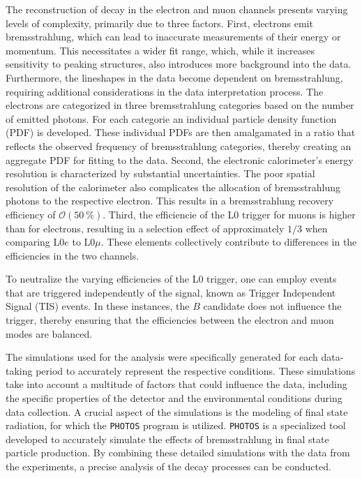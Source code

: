 The reconstruction of decay in the electron and muon channels presents varying levels of 
complexity, primarily due to three factors. First, electrons emit bremsstrahlung, which 
can lead to inaccurate measurements of their energy or momentum. This necessitates a wider 
fit range, which, while it increases sensitivity to peaking structures, also 
introduces more background into the data. Furthermore, the lineshapes in the data become 
dependent on bremsstrahlung, requiring additional considerations in the data interpretation 
process. The electrons are categorized in three bremsstrahlung categories based on the 
number of emitted photons. For each categorie an individual particle density function (PDF) 
is developed. These individual PDFs are then amalgamated in a ratio that reflects the observed 
frequency of bremsstrahlung categories, thereby creating an aggregate PDF for fitting to the 
data.
Second, the electronic calorimeter's energy resolution is characterized 
by substantial uncertainties. The poor spatial resolution of the calorimeter also complicates 
the allocation of bremsstrahlung photons to the respective electron. This results in a 
bremsstrahlung recovery efficiency of $\mathcal{O}(\SI{50}{\%})$.
Third, the efficiencie of the L0 trigger for muons is higher than for electrons, resulting 
in a selection effect of approximately $1/3$ when comparing $\text{L0}e$ to $\text{L0}\mu$.
These elements collectively contribute to differences in the efficiencies in the two channels. 

To neutralize the varying efficiencies of the L0 trigger, one can employ events that are 
triggered independently of the signal, known as Trigger Independent Signal (TIS) events. 
In these instances, the $B$ candidate does not influence the trigger, thereby ensuring that 
the efficiencies between the electron and muon modes are balanced.

The simulations used for the analysis were specifically generated for each data-taking period 
to accurately represent the respective conditions. These simulations take into account a multitude 
of factors that could influence the data, including the specific properties of the detector and 
the environmental conditions during data collection. A crucial aspect of the simulations is the 
modeling of final state radiation, for which the \texttt{PHOTOS} \cite{PHOTOS} program is utilized. 
\texttt{PHOTOS} is a specialized tool developed to accurately simulate the effects of bremsstrahlung in 
final state particle production. By combining these detailed simulations with the data from the 
experiments, a precise analysis of the decay processes can be conducted.

